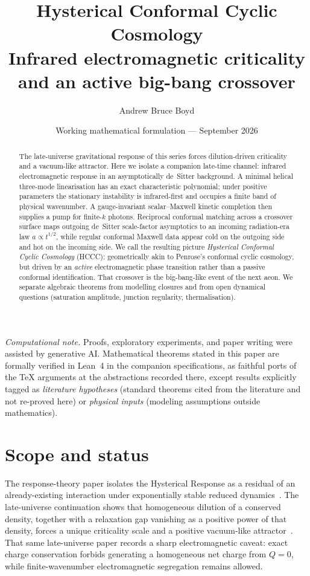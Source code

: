 \documentclass[11pt]{article}
\title{\textbf{Hysterical Conformal Cyclic Cosmology}\\[0.35em]
\large Infrared electromagnetic criticality and an active big-bang crossover}
\author{Andrew Bruce Boyd}
\date{Working mathematical formulation --- September 2026}
\theoremstyle{definition}
\theoremstyle{remark}
\begin{document}
\maketitle
\noindent\textit{Computational note.}
Proofs, exploratory experiments, and paper writing were assisted by generative AI.
Mathematical theorems stated in this paper are formally verified in Lean~4 in the
companion specifications, as faithful ports of the TeX arguments at the abstractions
recorded there, except results explicitly tagged as \emph{literature hypotheses}
(standard theorems cited from the literature and not re-proved here) or
\emph{physical inputs} (modeling assumptions outside mathematics).

\begin{abstract}
The late-universe gravitational response of this series forces dilution-driven criticality
and a vacuum-like attractor.
Here we isolate a companion late-time channel: infrared electromagnetic response in an
asymptotically de~Sitter background.
A minimal helical three-mode linearisation has an exact characteristic polynomial; under
positive parameters the stationary instability is infrared-first and occupies a finite band
of physical wavenumber.
A gauge-invariant scalar--Maxwell kinetic completion then supplies a pump for finite-$k$
photons.
Reciprocal conformal matching across a crossover surface maps outgoing de~Sitter scale-factor
asymptotics to an incoming radiation-era law $a\propto t^{1/2}$, while regular conformal
Maxwell data appear cold on the outgoing side and hot on the incoming side.
We call the resulting picture \emph{Hysterical Conformal Cyclic Cosmology} (HCCC):
geometrically akin to Penrose's conformal cyclic cosmology, but driven by an
\emph{active} electromagnetic phase transition rather than a passive conformal
identification.
That crossover is the big-bang-like event of the next aeon.
We separate algebraic theorems from modelling closures and from open dynamical questions
(saturation amplitude, junction regularity, thermalisation).
\end{abstract}
\tableofcontents
\newpage

\section{Scope and status}
\label{sec:scope}
The response-theory paper isolates the Hysterical Response as a residual of an
already-existing interaction under exponentially stable reduced dynamics~\cite{boyd2026response}.
The late-universe continuation shows that homogeneous dilution of a conserved density,
together with a relaxation gap vanishing as a positive power of that density, forces a
unique criticality scale and a positive vacuum-like attractor~\cite{boyd2026late}.
That same late-universe paper records a sharp electromagnetic caveat: exact charge
conservation forbids generating a homogeneous net charge from $Q=0$, while finite-wavenumber
electromagnetic segregation remains allowed.
\end{document}
